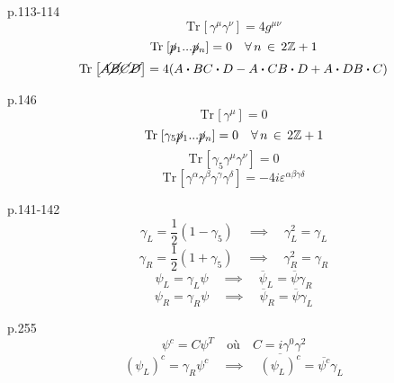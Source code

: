 \documentclass[12pt]{article}
\newcommand{\Z}{\mathbb{Z}}
\newcommand{\Tr}[1]{\mathrm{Tr}\hspace{1pt}\left[#1\right]}
\newcommand{\bdot}[0]{\boldsymbol{\cdot}}
\begin{document}
p.113-114 \\
\begin{equation}
  \Tr{\gamma^\mu\gamma^\nu} = 4g^{\mu\nu}
\end{equation}
\begin{equation}
  \Tr{\cancel{p}_1...\cancel{p}_n} = 0 \quad \forall\, n\, \in \, 2\Z+1
\end{equation}
\begin{equation}
  \Tr{\cancel{A}\cancel{B}\cancel{C}\cancel{D}} = 4(A\bdot B C \bdot D - A \bdot C B \bdot D + A \bdot D B \bdot C )
\end{equation}

p.146 \\
\begin{equation}
  \Tr{\gamma^\mu} = 0
\end{equation}
\begin{equation}
  \Tr{\gamma_5\cancel{p}_1...\cancel{p}_n} = 0 \quad \forall\, n\, \in \, 2\Z+1
\end{equation}
\begin{equation}
  \Tr{\gamma_5\gamma^\mu\gamma^\nu} = 0
\end{equation}
\begin{equation}
  \Tr{\gamma^\alpha\gamma^\beta\gamma^\gamma\gamma^\delta} = -4i\varepsilon^{\alpha\beta\gamma\delta}
\end{equation}

p.141-142
\begin{equation}
  \gamma_L = \frac{1}{2}(1-\gamma_5) \quad \implies \quad \gamma_L^2 = \gamma_L
\end{equation}
\begin{equation}
  \gamma_R = \frac{1}{2}(1+\gamma_5) \quad \implies \quad \gamma_R^2 = \gamma_R
\end{equation}
\begin{equation}
  \psi_L = \gamma_L\psi \quad \implies \quad \overline{\psi}_L = \overline{\psi}\gamma_R
\end{equation}
\begin{equation}
  \psi_R = \gamma_R\psi \quad \implies \quad \overline{\psi}_R = \overline{\psi}\gamma_L
\end{equation}

p.255 \\
\begin{equation}
  \psi^c = C\psi^T \quad \text{où} \quad C = i\gamma^0\gamma^2
\end{equation}
\begin{equation}
  (\psi_L)^c = \gamma_R\psi^c \quad \implies \quad \overline{(\psi_L)^c} = \overline{\psi^c}\gamma_L
\end{equation}
\end{document}
